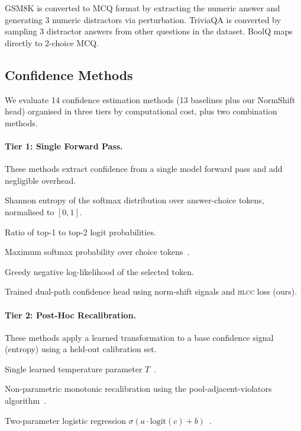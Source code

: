 \documentclass[11pt,a4paper]{article}
\newcommand{\hlcc}{\textsc{hlcc}}
\begin{document}
GSM8K is converted to MCQ format by extracting the numeric answer and
generating 3 numeric distractors via perturbation.  TriviaQA is
converted by sampling 3 distractor answers from other questions in the
dataset.  BoolQ maps directly to 2-choice MCQ.

\subsection{Confidence Methods}

We evaluate 14 confidence estimation methods (13 baselines plus our
NormShift head) organised in three tiers by computational cost, plus
two combination methods.

\paragraph{Tier 1: Single Forward Pass.}
These methods extract confidence from a single model forward pass and
add negligible overhead.

\begin{description}[nosep,leftmargin=1.5em]
  \item[Entropy] Shannon entropy of the softmax distribution over
        answer-choice tokens, normalised to $[0,1]$.
  \item[Top-$k$] Ratio of top-1 to top-2 logit probabilities.
  \item[MSP] Maximum softmax probability over choice
        tokens~\cite{hendrycks2017baseline}.
  \item[G-NLL] Greedy negative log-likelihood of the selected token.
  \item[NormShift (\hlcc{})] Trained dual-path confidence head using
        norm-shift signals and \hlcc{} loss (ours).
\end{description}

\paragraph{Tier 2: Post-Hoc Recalibration.}
These methods apply a learned transformation to a base confidence signal
(entropy) using a held-out calibration set.

\begin{description}[nosep,leftmargin=1.5em]
  \item[Temperature Scaling] Single learned temperature parameter
        $T$~\cite{guo2017calibration}.
  \item[Isotonic Regression] Non-parametric monotonic recalibration
        using the pool-adjacent-violators
        algorithm~\cite{zadrozny2002transforming}.
  \item[Platt Scaling] Two-parameter logistic regression
        $\sigma(a \cdot \text{logit}(c) + b)$~\cite{platt1999probabilistic}.
\end{description}
\end{document}
